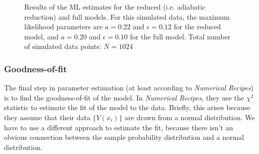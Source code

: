 \documentclass{article}
\begin{document}
\begin{figure}
  \centering
  \begin{subfigure}{0.48\textwidth}
  \end{subfigure}
  \hfill
  \begin{subfigure}{0.48\textwidth}
  \end{subfigure}
  \caption[Model fits]{Results of the ML estimates for the reduced
    (i.e. adiabatic reduction) and full models. For this simulated
    data, the maximum likelihood parameters are $a = 0.22$ and
    $\epsilon = 0.12$ for the reduced model, and $a = 0.20$ and
    $\epsilon = 0.10$ for the full model. Total number of simulated
    data points: $N = 1024$}
  \label{fig:model-fits-small-a}
\end{figure}

\subsubsection{Goodness-of-fit}
\label{sec:goodness-fit}

The final step in parameter estimation (at least according to
\textit{Numerical Recipes}) is to find the goodness-of-fit of the
model. In \textit{Numerical Recipes}, they use the $\chi^2$ statistic
to estimate the fit of the model to the data. Briefly, this arises
because they assume that their data $\{Y(x_i)\}$ are drawn from a
normal distribution. We have to use a different approach to estimate
the fit, because there isn't an obvious connection between the sample
probability distribution and a normal distribution.
\end{document}
